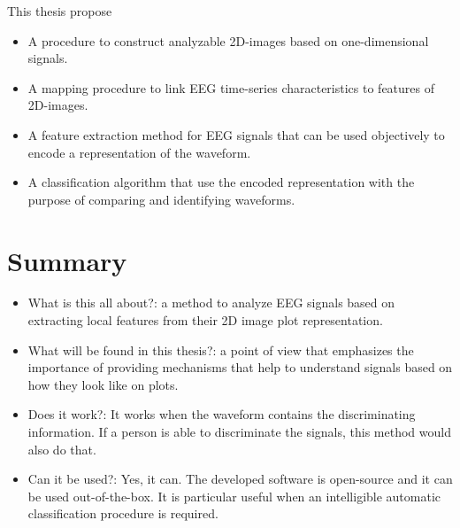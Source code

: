 This thesis propose

\begin{itemize}
\item A procedure to construct analyzable 2D-images based on one-dimensional signals.
\item A mapping procedure to link EEG time-series characteristics to features of 2D-images.
\item A feature extraction method for EEG signals that can be used objectively to encode a representation of the waveform.
\item A classification algorithm that use the encoded representation with the purpose of comparing and identifying waveforms.
\end{itemize}

\section{Summary}

\begin{itemize}
\item What is this all about?: a method to analyze EEG signals based on extracting local features from their 2D image plot representation.
\item What will be found in this thesis?: a point of view that emphasizes the importance of providing mechanisms that help to understand signals based on how they look like on plots.
\item Does it work?: It works when the waveform contains the discriminating information.  If a person is able to discriminate the signals, this method would also do that.
\item Can it be used?:  Yes, it can.  The developed software is open-source and it can be used out-of-the-box.  It is particular useful when an intelligible automatic classification procedure is required.
\end{itemize}


